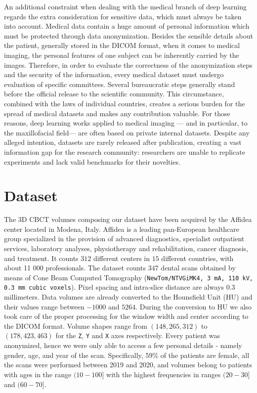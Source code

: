 An additional constraint when dealing with the medical branch of deep learning
regards the extra consideration for sensitive data, which must always be taken
into account. Medical data contain a huge amount of personal information which
must be protected through data anonymization. Besides the sensible details about
the patient, generally stored in the DICOM format, when it comes to medical
imaging, the personal features of one subject can be inherently carried by the
images. Therefore, in order to evaluate the correctness of the anonymization
steps and the security of the information, every medical dataset must undergo
evaluation of specific committees. Several bureaucratic steps generally stand
before the official release to the scientific community. This circumstance,
combined with the laws of individual countries, creates a serious burden for the
spread of medical datasets and makes any contribution valuable. For those
reasons, deep learning works applied to medical imaging — and in particular, to
the maxillofacial field— are often based on private internal datasets. Despite
any alleged intention, datasets are rarely released after publication, creating
a vast information gap for the research community: researchers are unable to
replicate experiments and lack valid benchmarks for their novelties.

\section{Dataset}
The 3D CBCT volumes composing our dataset have been acquired by the Affidea
center located in Modena, Italy. Affidea is a leading pan-European healthcare
group specialized in the provision of advanced diagnostics, specialist
outpatient services, laboratory analyses, physiotherapy and rehabilitation,
cancer diagnosis, and treatment. It counts $312$ different centers in $15$
different countries, with about 11 000 professionals. The dataset counts $347$
dental scans obtained by means of Cone Beam Computed Tomography
(\texttt{NewTom/NTVGiMK4, 3 mA, 110 kV, 0.3 mm cubic voxels}). Pixel spacing and
intra-slice distance are always $0.3$ millimeters. Data volumes are already
converted to the Hounsfield Unit (HU) and their values range between $-1000$ and
$5264$. During the conversion to HU we also took care of the proper processing
for the window width and center according to the DICOM format. Volume shapes
range from $(148, 265, 312)$ to $(178, 423, 463)$ for the \texttt{Z}, \texttt{Y}
and \texttt{X} axes respectively. Every patient was anonymized, hence we were
only able to access a few personal details - namely gender, age, and year of the
scan. Specifically, 59\% of the patients are female, all the scans were
performed between 2019 and 2020, and volumes belong to patients with ages in the
range $(10-100]$ with the highest frequencies in ranges $(20-30]$ and $(60-70]$.

